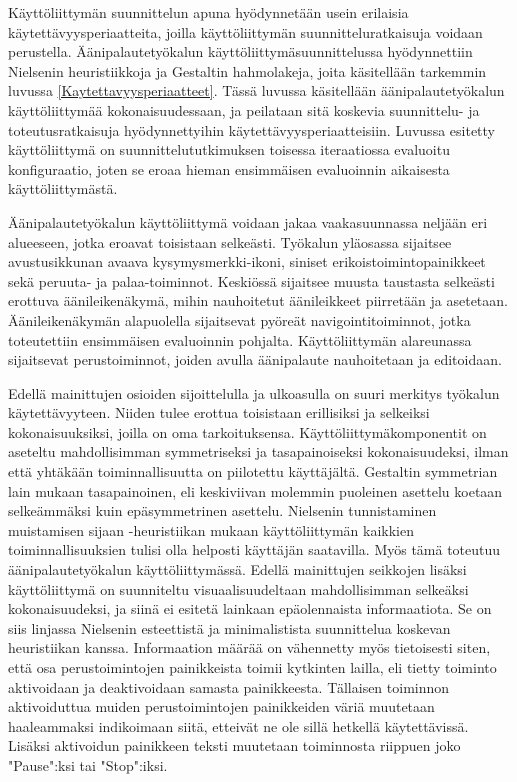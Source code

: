\documentclass[utf8]{gradu3}
\begin{document}
Käyttöliittymän suunnittelun apuna hyödynnetään usein erilaisia käytettävyysperiaatteita, joilla käyttöliittymän suunnitteluratkaisuja voidaan perustella. Äänipalautetyökalun käyttöliittymäsuunnittelussa hyödynnettiin Nielsenin heuristiikkoja ja Gestaltin hahmolakeja, joita käsitellään tarkemmin luvussa \ref{Kaytettavyysperiaatteet}. Tässä luvussa käsitellään äänipalautetyökalun käyttöliittymää kokonaisuudessaan, ja peilataan sitä koskevia suunnittelu- ja toteutusratkaisuja hyödynnettyihin käytettävyysperiaatteisiin. Luvussa esitetty käyttöliittymä on suunnittelututkimuksen toisessa iteraatiossa evaluoitu konfiguraatio, joten se eroaa hieman ensimmäisen evaluoinnin aikaisesta käyttöliittymästä. 

Äänipalautetyökalun käyttöliittymä voidaan jakaa vaakasuunnassa neljään eri alueeseen, jotka eroavat toisistaan selkeästi. Työkalun yläosassa sijaitsee avustusikkunan avaava kysymysmerkki-ikoni, siniset erikoistoimintopainikkeet sekä peruuta- ja palaa-toiminnot. Keskiössä sijaitsee muusta taustasta selkeästi erottuva äänileikenäkymä, mihin nauhoitetut äänileikkeet piirretään ja asetetaan. Äänileikenäkymän alapuolella sijaitsevat pyöreät navigointitoiminnot, jotka toteutettiin ensimmäisen evaluoinnin pohjalta. Käyttöliittymän alareunassa sijaitsevat perustoiminnot, joiden avulla äänipalaute nauhoitetaan ja editoidaan. 

Edellä mainittujen osioiden sijoittelulla ja ulkoasulla on suuri merkitys työkalun käytettävyyteen. Niiden tulee erottua toisistaan erillisiksi ja selkeiksi kokonaisuuksiksi, joilla on oma tarkoituksensa. Käyttöliittymäkomponentit on aseteltu mahdollisimman symmetriseksi ja tasapainoiseksi kokonaisuudeksi, ilman että yhtäkään toiminnallisuutta on piilotettu käyttäjältä. Gestaltin symmetrian lain mukaan tasapainoinen, eli keskiviivan molemmin puoleinen asettelu koetaan selkeämmäksi kuin epäsymmetrinen asettelu. Nielsenin tunnistaminen muistamisen sijaan -heuristiikan mukaan käyttöliittymän kaikkien toiminnallisuuksien tulisi olla helposti käyttäjän saatavilla. Myös tämä toteutuu äänipalautetyökalun käyttöliittymässä. Edellä mainittujen seikkojen lisäksi käyttöliittymä on suunniteltu visuaalisuudeltaan mahdollisimman selkeäksi kokonaisuudeksi, ja siinä ei esitetä lainkaan epäolennaista informaatiota. Se on siis linjassa Nielsenin esteettistä ja minimalistista suunnittelua koskevan heuristiikan kanssa. Informaation määrää on vähennetty myös tietoisesti siten, että osa perustoimintojen painikkeista toimii kytkinten lailla, eli tietty toiminto aktivoidaan ja deaktivoidaan samasta painikkeesta. Tällaisen toiminnon aktivoiduttua muiden perustoimintojen painikkeiden väriä muutetaan haaleammaksi indikoimaan siitä, etteivät ne ole sillä hetkellä käytettävissä. Lisäksi aktivoidun painikkeen teksti muutetaan toiminnosta riippuen joko "Pause":ksi tai "Stop":iksi.
\end{document}
